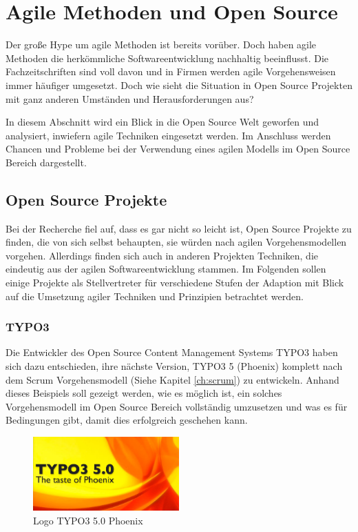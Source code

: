 \section{Agile Methoden und Open Source}
Der große Hype um agile Methoden ist bereits vorüber. Doch haben agile Methoden die herkömmliche Softwareentwicklung nachhaltig beeinflusst. Die Fachzeitschriften sind voll davon und in Firmen werden agile Vorgehensweisen immer häufiger umgesetzt. Doch wie sieht die Situation in Open Source Projekten mit ganz anderen Umständen und Herausforderungen aus?

In diesem Abschnitt wird ein Blick in die Open Source Welt geworfen und analysiert, inwiefern agile Techniken eingesetzt werden. Im Anschluss werden Chancen und Probleme bei der Verwendung eines agilen Modells im Open Source Bereich dargestellt.

\subsection{Open Source Projekte}
Bei der Recherche fiel auf, dass es gar nicht so leicht ist, Open Source Projekte zu finden, die von sich selbst behaupten, sie würden nach agilen Vorgehensmodellen vorgehen. Allerdings finden sich auch in anderen Projekten Techniken, die eindeutig aus der agilen Softwareentwicklung stammen. Im Folgenden sollen einige Projekte als Stellvertreter für verschiedene Stufen der Adaption mit Blick auf die Umsetzung agiler Techniken und Prinzipien betrachtet werden.

\subsubsection{TYPO3}
Die Entwickler des Open Source Content Management Systems TYPO3 haben sich dazu entschieden, ihre nächste Version, TYPO3 5 (Phoenix) komplett nach dem Scrum Vorgehensmodell  (Siehe Kapitel \ref{ch:scrum}) zu entwickeln. Anhand dieses Beispiels soll gezeigt werden, wie es möglich ist, ein solches Vorgehensmodell im Open Source Bereich vollständig umzusetzen und was es für Bedingungen gibt, damit dies erfolgreich geschehen kann.
\begin{figure}[h]
	\centering
	\includegraphics[width=0.5\textwidth]{images/typo3_Phoenix_logo.jpg}
	\caption{Logo TYPO3 5.0 Phoenix\cite{bib:phoenix-logo}}
	\label{Logo-Phoenix}
\end{figure}

